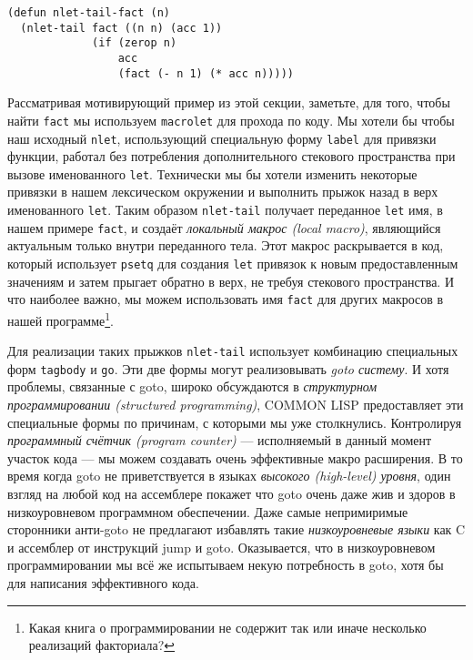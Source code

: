 \begin{verbatim}
(defun nlet-tail-fact (n)
  (nlet-tail fact ((n n) (acc 1))
             (if (zerop n)
                 acc
                 (fact (- n 1) (* acc n)))))
\end{verbatim}

Рассматривая мотивирующий пример из этой секции, заметьте, для того, чтобы найти \verb"fact" мы используем \verb"macrolet" для прохода по коду. Мы хотели бы чтобы наш исходный \verb"nlet", использующий специальную форму \verb"label" для привязки функции, работал без потребления дополнительного стекового пространства при вызове именованного \verb"let". Технически мы бы хотели изменить некоторые привязки в нашем лексическом окружении и выполнить прыжок назад в верх именованного \verb"let". Таким образом \verb"nlet-tail" получает переданное \verb"let" имя, в нашем примере \verb"fact", и создаёт \emph{локальный макрос (local macro)}, являющийся актуальным только внутри переданного тела. Этот макрос раскрывается в код, который использует \verb"psetq" для создания \verb"let" привязок к новым предоставленным значениям и затем прыгает обратно в верх, не требуя стекового пространства. И что наиболее важно, мы можем использовать имя \verb"fact" для других макросов в нашей программе\footnote{Какая книга о программировании не содержит так или иначе несколько реализаций факториала?}.



Для реализации таких прыжков \verb"nlet-tail" использует комбинацию специальных форм \verb"tagbody" и \verb"go". Эти две формы могут реализовывать \emph{goto систему}. И хотя проблемы, связанные с goto, широко обсуждаются в \emph{структурном программировании (structured programming)}, COMMON LISP предоставляет эти специальные формы по причинам, с которыми мы уже столкнулись. Контролируя \emph{программный счётчик (program counter)} --- исполняемый в данный момент участок кода --- мы можем создавать очень эффективные макро расширения. В то время когда goto не приветствуется в языках \emph{высокого (high-level) уровня}, один взгляд на любой код на ассемблере покажет что goto очень даже жив и здоров в низкоуровневом программном обеспечении. Даже самые непримиримые сторонники анти-goto не предлагают избавлять такие \emph{низкоуровневые языки} как C и ассемблер от инструкций jump и goto. Оказывается, что в низкоуровневом программировании мы всё же испытываем некую потребность в goto, хотя бы для написания эффективного кода.

